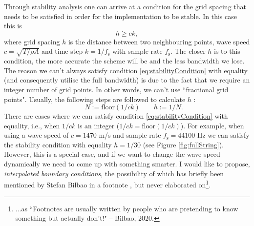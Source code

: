 \documentclass[dvipsnames]{article}
\begin{document}
Through stability analysis one can arrive at a condition for the grid spacing that needs to be satisfied in order for the implementation to be stable. In this case this is
\begin{equation}\label{eq:stabilityCondition}
    h \geq ck,
\end{equation}
where grid spacing $h$ is the distance between two neighbouring points, wave speed $c = \sqrt{T/\rho A}$ and time step $k = 1/f_\text{s}$ with sample rate $f_\text{s}$. The closer $h$ is to this condition, the more accurate the scheme will be and the less bandwidth we lose. The reason we can't always satisfy condition \eqref{eq:stabilityCondition} with equality (and consequently utilise the full bandwidth) is due to the fact that we require an integer number of grid points. In other words, we can't use ``fractional grid points". Usually, the following steps are followed to calculate $h$ \cite[Section 6.2.10]{Bilbao2009}:
\begin{equation}
    \qquad N := \text{floor}(1/ck) \qquad h := 1/N.
\end{equation}
There are cases where we can satisfy condition \eqref{eq:stabilityCondition} with equality, i.e., when $1/ck$ is an integer ($1/ck = \text{floor}(1/ck)$). For example, when using a wave speed of $c = 1470$ m/s and sample rate $f_\text{s} = 44100$ Hz we can satisfy the stability condition with equality $h = 1/30$ (see Figure \ref{fig:fullString}). However, this is a special case, and if we want to change the wave speed dynamically we need to come up with something smarter. I would like to propose, \textit{interpolated boundary conditions}, the possibility of which has briefly been mentioned by Stefan Bilbao in a footnote \cite[p. 145]{Bilbao2009}, but never elaborated on\footnote{...as ``Footnotes are usually written by people who are pretending to know something but actually don't!" -- Bilbao, 2020.}. 
\end{document}
